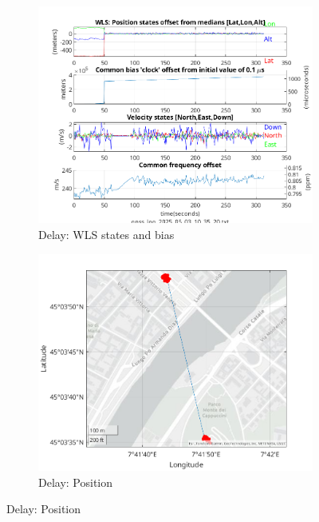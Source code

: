                 \begin{figure}[h!]
            \centering
            \begin{subfigure}{0.23\textwidth}
                \includegraphics[width=\textwidth]{images/tests/Monte_Cappuccini/Spoofing/task6_figures/Samsung_A51_Monte_Cappuccini_fig5.png}
                \caption{Delay: WLS states and bias}
            \end{subfigure}
            \hfill
            \begin{subfigure}{0.23\textwidth}
                \includegraphics[width=\textwidth]{images/tests/Monte_Cappuccini/Spoofing/task6_figures/Samsung_A51_Monte_Cappuccini_fig6.png}
                \caption{Delay: Position}
            \end{subfigure}
        \end{figure}

